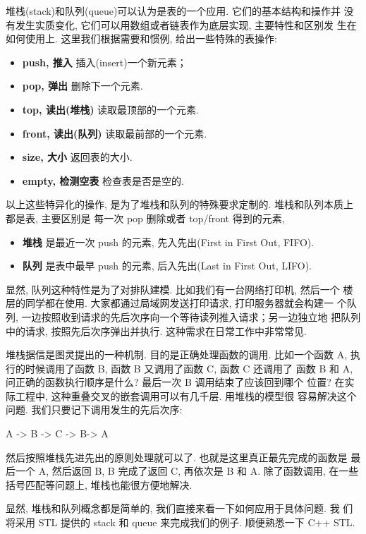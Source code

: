 \documentclass[a4paper]{ctexart}
\theoremstyle{definition}
\theoremstyle{definition}
\begin{document}
堆栈(stack)和队列(queue)可以认为是表的一个应用. 它们的基本结构和操作并
没有发生实质变化, 它们可以用数组或者链表作为底层实现, 主要特性和区别发
生在如何使用上. 这里我们根据需要和惯例, 给出一些特殊的表操作:
\begin{itemize}
  \item {\bf push, 推入} 插入(insert)一个新元素；
  \item {\bf pop, 弹出} 删除下一个元素. 
  \item {\bf top, 读出(堆栈)} 读取最顶部的一个元素.
  \item {\bf front, 读出(队列)} 读取最前部的一个元素.
  \item {\bf size, 大小} 返回表的大小.
  \item {\bf empty, 检测空表} 检查表是否是空的.
  
\end{itemize}

以上这些特异化的操作, 是为了堆栈和队列的特殊要求定制的. 堆栈和队列本质上都是表, 主要区别是
每一次 pop 删除或者 top/front 得到的元素,
\begin{itemize}
\item {\bf 堆栈} 是最近一次 push 的元素, 先入先出(First in First Out,
  FIFO).
\item {\bf 队列} 是表中最早 push 的元素, 后入先出(Last in First Out,
  LIFO).
\end{itemize}

显然, 队列这种特性是为了对排队建模. 比如我们有一台网络打印机, 然后一个
楼层的同学都在使用. 大家都通过局域网发送打印请求, 打印服务器就会构建一
个队列, 一边按照收到请求的先后次序向一个等待读列推入请求；另一边独立地
把队列中的请求, 按照先后次序弹出并执行. 这种需求在日常工作中非常常见.

堆栈据信是图灵提出的一种机制. 目的是正确处理函数的调用. 比如一个函数
A, 执行的时候调用了函数 B, 函数 B 又调用了函数 C, 函数 C 还调用了 函数
B 和 A, 问正确的函数执行顺序是什么? 最后一次 B 调用结束了应该回到哪个
位置? 在实际工程中, 这种重叠交叉的嵌套调用可以有几千层. 用堆栈的模型很
容易解决这个问题. 我们只要记下调用发生的先后次序:

\begin{center}
A -> B -> C -> B-> A
\end{center}

然后按照堆栈先进先出的原则处理就可以了. 也就是这里真正最先完成的函数是
最后一个 A, 然后返回 B, B 完成了返回 C, 再依次是 B 和 A. 除了函数调用,
在一些括号匹配等问题上, 堆栈也能很方便地解决.

显然, 堆栈和队列概念都是简单的, 我们直接来看一下如何应用于具体问题. 我
们将采用 STL 提供的 stack 和 queue 来完成我们的例子. 顺便熟悉一下 C++
STL.
\end{document}
